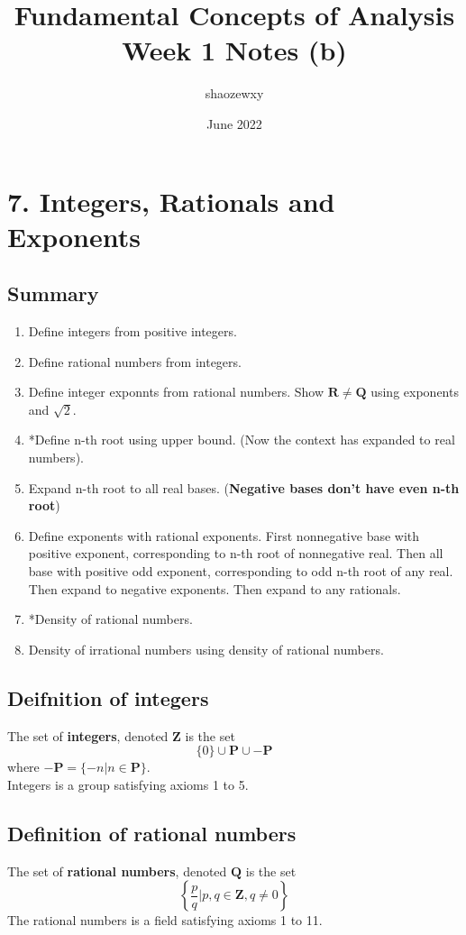 \documentclass{article}
\title{Fundamental Concepts of Analysis\\
\large{Week 1 Notes (b)}}
\author{shaozewxy }
\date{June 2022}
\begin{document}
\maketitle
\section*{7. Integers, Rationals and Exponents}
\subsection*{Summary}
\begin{enumerate}
    \item Define integers from positive integers.
    \item Define rational numbers from integers.
    \item Define integer exponnts from rational numbers.
    \subitem Show $\mathbf{R} \neq \mathbf{Q}$ using exponents and $\sqrt{2}$.
    \item *Define n-th root using upper bound. (Now the context has expanded to real numbers).
    \item Expand n-th root to all real bases. (\textbf{Negative bases don't have even n-th root})
    \item Define exponents with rational exponents.
    \subitem First nonnegative base with positive exponent, corresponding to n-th root of nonnegative real.
    \subitem Then all base with positive odd exponent, corresponding to odd n-th root of any real.
    \subitem Then expand to negative exponents.
    \subitem Then expand to any rationals.
    \item *Density of rational numbers. 
    \item Density of irrational numbers using density of rational numbers.
\end{enumerate}
\subsection*{Deifnition of integers}
The set of \textbf{integers}, denoted $\mathbf{Z}$ is the set
\begin{equation*}
    \{0\}\cup \mathbf{P} \cup -\mathbf{P}
\end{equation*}
where $-\mathbf{P} = \{-n | n \in \mathbf{P}\}$.\\
Integers is a group satisfying axioms 1 to 5.
\subsection*{Definition of rational numbers}
The set of \textbf{rational numbers}, denoted $\mathbf{Q}$ is the set
\begin{equation*}
    \left\{
        \frac{p}{q} | p, q \in \mathbf{Z}, q \neq 0
    \right\}
\end{equation*}
The rational numbers is a field satisfying axioms 1 to 11.
\end{document}
